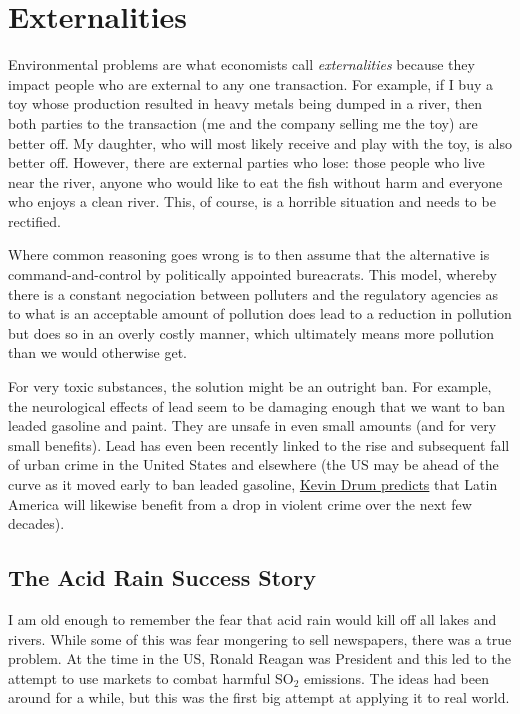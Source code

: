 \section{Externalities}

Environmental problems are what economists call \emph{externalities} because
they impact people who are external to any one transaction. For example, if I
buy a toy whose production resulted in heavy metals being dumped in a river,
then both parties to the transaction (me and the company selling me the toy)
are better off. My daughter, who will most likely receive and play with the
toy, is also better off. However, there are external parties who lose: those
people who live near the river, anyone who would like to eat the fish without
harm and everyone who enjoys a clean river. This, of course, is a horrible
situation and needs to be rectified.

Where common reasoning goes wrong is to then assume that the alternative is
command-and-control by politically appointed bureacrats. This model, whereby
there is a constant negociation between polluters and the regulatory agencies
as to what is an acceptable amount of pollution does lead to a reduction in
pollution but does so in an overly costly manner, which ultimately means more
pollution than we would otherwise get.

For very toxic substances, the solution might be an outright ban. For example,
the neurological effects of lead seem to be damaging enough that we want to ban
leaded gasoline and paint. They are unsafe in even small amounts (and for very
small benefits). Lead has even been recently linked to the rise and subsequent
fall of urban crime in the United States and elsewhere (the US may be ahead of
the curve as it moved early to ban leaded gasoline,
\href{http://www.motherjones.com/kevin-drum/2013/01/lead-and-crime-ill-be-melissa-harris-perry-show-sunday-10-am}{Kevin
Drum predicts} that Latin America will likewise benefit from a drop in violent
crime over the next few decades).

\subsection{The Acid Rain Success Story}

I am old enough to remember the fear that acid rain would kill off all lakes
and rivers. While some of this was fear mongering to sell newspapers, there was
a true problem. At the time in the US, Ronald Reagan was President and this led
to the attempt to use markets to combat harmful SO${}_2$ emissions. The ideas
had been around for a while, but this was the first big attempt at applying it
to real world.

